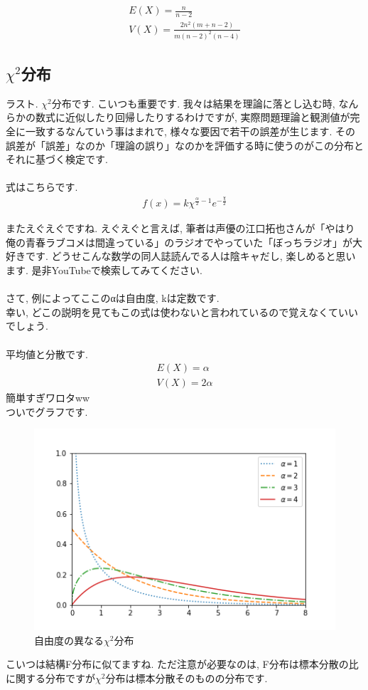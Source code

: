 \documentclass[11pt,a4paper,uplatex]{ujreport} 	%
\begin{document}
\begin{eqnarray}
E(X) = \frac{n}{n-2}\\
V(X) = \frac{2n^2 (m+n-2)}{m(n-2)^2(n-4)}
\end{eqnarray}

\subsection{$\chi^2$分布}
ラスト. $\chi^2$分布です. こいつも重要です. 我々は結果を理論に落とし込む時, なんらかの数式に近似したり回帰したりするわけですが, 実際問題理論と観測値が完全に一致するなんていう事はまれで, 様々な要因で若干の誤差が生じます. その誤差が「誤差」なのか「理論の誤り」なのかを評価する時に使うのがこの分布とそれに基づく検定です. \\
\\
式はこちらです. 
\begin{eqnarray}
f(x) = k\chi^{\frac{\alpha}{2}-1}e^{-\frac{\chi}{2}}
\end{eqnarray}

またえぐえぐですね. えぐえぐと言えば, 筆者は声優の江口拓也さんが「やはり俺の青春ラブコメは間違っている」のラジオでやっていた「ぼっちラジオ」が大好きです. どうせこんな数学の同人誌読んでる人は陰キャだし, 楽しめると思います. 是非YouTubeで検索してみてください.\\
\\
さて, 例によってここのαは自由度, kは定数です.\\
幸い, どこの説明を見てもこの式は使わないと言われているので覚えなくていいでしょう.\\
\\
平均値と分散です.
\begin{eqnarray}
E(X) = \alpha \\
V(X) = 2\alpha
\end{eqnarray}
簡単すぎワロタww\\
ついでグラフです.


\begin{figure}[H]
\label{im:chi}
  \centering
  \includegraphics[width=120mm,bb=0 0 432 288]{figures/kai.png}
  \caption{自由度の異なる$\chi^2$分布}
\end{figure}
 こいつは結構F分布に似てますね. ただ注意が必要なのは, F分布は標本分散の比に関する分布ですが$\chi^2$分布は標本分散そのものの分布です.
\end{document}
